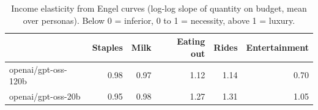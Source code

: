 \begin{table}[!htbp]\centering\small
\caption{Income elasticity from Engel curves (log-log slope of quantity on budget, mean over personas). Below 0 = inferior, 0 to 1 = necessity, above 1 = luxury.}\label{tab:income}
\begin{tabular}{lrrrrr}
\hline
 & Staples & Milk & Eating out & Rides & Entertainment \\ \hline
openai/gpt-oss-120b & 0.98 & 0.97 & 1.12 & 1.14 & 0.70 \\
openai/gpt-oss-20b & 0.95 & 0.98 & 1.27 & 1.31 & 1.05 \\
\hline
\end{tabular}
\end{table}